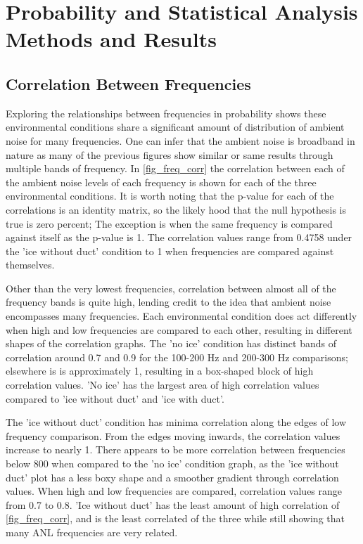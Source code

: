 

\section{Probability and Statistical Analysis Methods and Results}

\subsection{Correlation Between Frequencies}

Exploring the relationships between frequencies in probability shows these environmental conditions share a significant amount of distribution of ambient noise for many frequencies. One can infer that the ambient noise is broadband in nature as many of the previous figures show similar or same results through multiple bands of frequency. In \autoref{fig_freq_corr} the correlation between each of the ambient noise levels of each frequency is shown for each of the three environmental conditions. It is worth noting that the p-value for each of the correlations is an identity matrix, so the likely hood that the null hypothesis is true is zero percent; The exception is when the same frequency is compared against itself as the p-value is 1. The correlation values range from 0.4758 under the 'ice without duct' condition to 1 when frequencies are compared against themselves. 

Other than the very lowest frequencies, correlation between almost all of the frequency bands is quite high, lending credit to the idea that ambient noise encompasses many frequencies.  Each environmental condition does act differently when high and low frequencies are compared to each other, resulting in different shapes of the correlation graphs. The 'no ice' condition has distinct bands of correlation around 0.7 and 0.9 for the 100-200 Hz and 200-300 Hz comparisons; elsewhere is is approximately 1, resulting in a box-shaped block of high correlation values. 'No ice' has the largest area of high correlation values compared to 'ice without duct' and 'ice with duct'.

The 'ice without duct' condition has minima correlation along the edges of low frequency comparison. From the edges moving inwards, the correlation values increase to nearly 1. There appears to be more correlation between frequencies below 800 when compared to the 'no ice' condition graph, as the 'ice without duct' plot has a less boxy shape and a smoother gradient through correlation values. When high and low frequencies are compared, correlation values range from 0.7 to 0.8. 'Ice without duct' has the least amount of high correlation of \autoref{fig_freq_corr}, and is the least correlated of the three while still showing that many ANL frequencies are very related.

